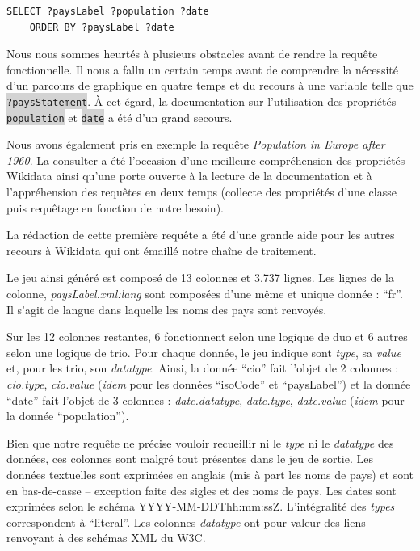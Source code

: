 \documentclass[hidelinks, 12pt]{report}
\newcommand{\code}[1]{\colorbox{LightGray}{\texttt{#1}}}
\begin{document}
\begin{lstlisting}[language=SPARQL]
	SELECT ?paysLabel ?population ?date
	ORDER BY ?paysLabel ?date
\end{lstlisting}

Nous nous sommes heurtés à plusieurs obstacles avant de rendre la requête fonctionnelle. Il nous a fallu un certain temps avant de comprendre la nécessité d'un parcours de graphique en quatre temps et du recours à une variable telle que \code{?paysStatement}. À cet égard, la documentation sur l'utilisation des propriétés \code{population}\autocite{wikipop} et \code{date}\autocite{wikidate} a été d'un grand secours. 

Nous avons également pris en exemple la requête \emph{Population in Europe after 1960}\autocite{wiki1960}. La consulter a été l'occasion d'une meilleure compréhension des propriétés Wikidata ainsi qu'une porte ouverte à la lecture de la documentation et à l'appréhension des requêtes en deux temps (collecte des propriétés d'une classe puis requêtage en fonction de notre besoin).

La rédaction de cette première requête a été d'une grande aide pour les autres recours à Wikidata qui ont émaillé notre chaîne de traitement.
\newline

Le jeu ainsi généré est composé de 13 colonnes et 3.737 lignes. Les lignes de la colonne, \textit{paysLabel.xml:lang} sont composées d'une même et unique donnée : \enquote{fr}. Il s'agit de langue dans laquelle les noms des pays sont renvoyés. 

\label{query1tab}Sur les 12 colonnes restantes, 6 fonctionnent selon une logique de duo et 6 autres selon une logique de trio. Pour chaque donnée, le jeu indique sont \textit{type}, sa \textit{value} et, pour les trio, son \textit{datatype}. Ainsi, la donnée \enquote{cio} fait l'objet de 2 colonnes : \textit{cio.type}, \textit{cio.value} (\textit{idem} pour les données \enquote{isoCode} et \enquote{paysLabel}) et la donnée \enquote{date} fait l'objet de 3 colonnes : \textit{date.datatype}, \textit{date.type}, \textit{date.value} (\textit{idem} pour la donnée \enquote{population}). 

\label{nongrata}Bien que notre requête ne précise vouloir recueillir ni le \textit{type} ni le \textit{datatype} des données, ces colonnes sont malgré tout présentes dans le jeu de sortie. Les données textuelles sont exprimées en anglais (mis à part les noms de pays) et sont en bas-de-casse -- exception faite des sigles et des noms de pays. Les dates sont exprimées selon le schéma YYYY-MM-DDThh\!\!:mm\!\!:ssZ. L'intégralité des \textit{types} correspondent à \enquote{literal}. Les colonnes \textit{datatype} ont pour valeur des liens renvoyant à des schémas XML du W3C.
\end{document}
